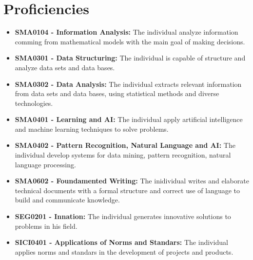 \documentclass[
	fontsize=10pt, %
	twoside=false, %
	secnumdepth=1, %
]{kaobook}
\begin{document}
\listoftables %

\endgroup


\mainmatter %

\chapter*{Proficiencies}

\begin{itemize}
\item \textbf{SMA0104 - Information Analysis:} The individual analyze information comming from mathematical models with the main goal of making decisions.

\item \textbf{SMA0301 - Data Structuring:} The individual is capable of structure and analyze data sets and data bases.

\item \textbf{SMA0302 - Data Analysis:} The individual extracts relevant information from data sets and data bases, using statistical methods and diverse technologies.

\item \textbf{SMA0401 - Learning and AI:} The individual apply artificial intelligence and machine learning techniques to solve problems.
\item  \textbf{SMA0402 - Pattern Recognition, Natural Language and AI:} The individual develop systems for data mining, pattern recognition, natural language processing.
\item \textbf{SMA0602 - Foundamented Writing:} The inidividual writes and elaborate technical documents with a formal structure and correct use of language to build and communicate knowledge.
\item \textbf{SEG0201 - Innation:} The individual generates innovative solutions to problems in his field. 

\item \textbf{SICI0401 - Applications of Norms and Standars:} The individual applies norms and standars in the development of projects and products. 
\end{itemize}
\end{document}
